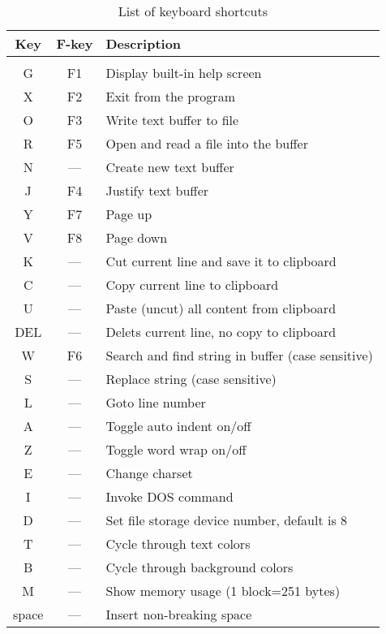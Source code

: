 \documentclass{article}
\begin{document}
	\begin{longtable}{c c l}
		\caption{List of keyboard shortcuts} \\
	    \textbf{Key} & \textbf{F-key} & \textbf{Description} \\
	    \hline \\
            G    & F1    & Display built-in help screen \\
            X    & F2    & Exit from the program \\
            O    & F3    & Write text buffer to file \\
            R    & F5    & Open and read a file into the buffer \\
            N    & ---   & Create new text buffer \\
            J    & F4    & Justify text buffer \\
            Y    & F7    & Page up \\
            V    & F8    & Page down \\
            K    & ---   & Cut current line and save it to clipboard \\
            C    & ---   & Copy current line to clipboard \\
            U    & ---   & Paste (uncut) all content from clipboard \\
            DEL  & ---   & Delets current line, no copy to clipboard \\
            W    & F6    & Search and find string in buffer (case sensitive) \\
            S    & ---   & Replace string (case sensitive) \\
            L    & ---   & Goto line number \\
            A    & ---   & Toggle auto indent on/off \\
            Z    & ---   & Toggle word wrap on/off \\
            E    & ---   & Change charset\\
            I    & ---   & Invoke DOS command\\
            D    & ---   & Set file storage device number, default is 8 \\
            T    &  ---  & Cycle through text colors \\
            B    &  ---  & Cycle through background colors \\
            M    &  ---  & Show memory usage (1 block=251 bytes) \\
            space& ---   & Insert non-breaking space 
        \end{longtable}
\end{document}
